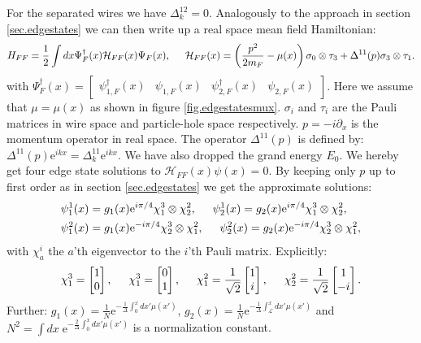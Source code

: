 For the separated wires we have $\Delta^{12}_k = 0$. Analogously to the approach in section \ref{sec.edgestates} we can then write up a real space mean field Hamiltonian:
\begin{equation}
H_{FF} = \frac{1}{2}\int dx \Psi^\dagger_{F}(x) \mathcal{H}_{FF}(x) \Psi_{F}(x), \hspace{0.5cm} \mathcal{H}_{FF}(x) = \left(\frac{p^2}{2m_F} - \mu(x)\right)\sigma_0\otimes \tau_3 + \Delta^{11}(p)\sigma_3\otimes \tau_1.
\label{eq.2wiresMFHamiltonianrealspace}
\end{equation}
with $\Psi^\dagger_{F}(x) = \begin{bmatrix} \psi^\dagger_{1,F}(x) & \psi_{1,F}(x) & \psi^\dagger_{2,F}(x) & \psi_{2,F}(x)\end{bmatrix}$. Here we assume that $\mu = \mu(x)$ as shown in figure \ref{fig.edgestatesmux}. $\sigma_i$ and $\tau_i$ are the Pauli matrices in wire space and particle-hole space respectively. $p = -i\partial_x$ is the momentum operator in real space. The operator $\Delta^{11}(p)$ is defined by: $\Delta^{11}(p)\text{e}^{ikx} = \Delta^{11}_k\text{e}^{ikx}$. We have also dropped the grand energy $E_0$. We hereby get four edge state solutions to $\mathcal{H}_{FF}(x)\psi(x) = 0$. By keeping only $p$ up to first order as in section \ref{sec.edgestates} we get the approximate solutions:
\begin{align}
\psi^1_1(x) &= g_1(x)\text{e}^{i\pi/4}\chi^{3}_1\otimes\chi^{2}_2, \hspace{0.5cm} \psi^1_2(x) = g_2(x)\text{e}^{i\pi/4}\chi^{3}_1\otimes\chi^{2}_2, \nonumber \\
\psi^2_1(x) &= g_1(x)\text{e}^{-i\pi/4}\chi^{3}_2\otimes\chi^{2}_1, \hspace{0.5cm} \psi^2_2(x) = g_2(x)\text{e}^{-i\pi/4}\chi^{3}_2\otimes\chi^{2}_1,
\end{align}
with $\chi^{i}_a$ the $a$'th eigenvector to the $i$'th Pauli matrix. Explicitly: 
\begin{equation}
\chi^{3}_1 = \begin{bmatrix} 1 \\ 0 \end{bmatrix},  \hspace{0.5cm} \chi^{3}_1 = \begin{bmatrix} 0 \\ 1 \end{bmatrix}, \hspace{0.5cm} \chi^2_1 = \frac{1}{\sqrt{2}}\begin{bmatrix} 1 \\ i \end{bmatrix}, \hspace{0.5cm} \chi^2_2 = \frac{1}{\sqrt{2}}\begin{bmatrix} 1 \\ -i \end{bmatrix}. \nonumber
\end{equation}
Further: $g_1(x) = \frac{1}{N}\text{e}^{-\frac{1}{\Delta}\int_{0}^{x} dx' \mu(x')}$, $g_2(x) = \frac{1}{N}\text{e}^{-\frac{1}{\Delta}\int_{\mathcal{L}}^{x} dx' \mu(x')}$ and $N^2 = \int dx \; \text{e}^{-\frac{2}{\Delta}\int_{0}^{x} dx' \mu(x')}$ is a normalization constant.

